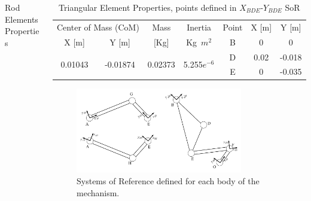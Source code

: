 \documentclass[final]{beamer}
\newlength{\onecolwid}
\newlength{\twocolwid}
\begin{document}
\begin{frame}[t]
\begin{columns}[t]
\begin{column}{\twocolwid}
\begin{columns}[t, totalwidth=\twocolwid]
\begin{column}{\onecolwid}
\begin{table}[h]
	\caption{Rod Elements Properties}
\end{table}
\end{column}

\begin{column}{\onecolwid}

\begin{table}[!h]
\centering
    \label{TAB:TriangleProperties}
\begin{tabular}{ccccccc}
\toprule
\multicolumn{2}{c}{Center of Mass (CoM)}                                  & \multicolumn{1}{c}{Mass}                     & \multicolumn{1}{c}{Inertia}                        & \multicolumn{1}{|c}{Point} & \multicolumn{1}{c}{X {[}m{]}} & \multicolumn{1}{c}{Y {[}m{]}} \\ \cline{5-7} 
X {[}m{]}                & \multicolumn{1}{c}{Y {[}m{]}}                 & \multicolumn{1}{c}{{[}Kg{]}}                 & \multicolumn{1}{c}{Kg~$m^2$}                       & \multicolumn{1}{|c}{B}     & \multicolumn{1}{c}{0}         & \multicolumn{1}{c}{0}         \\ \cline{1-4}
\multirow{2}{*}{0.01043} & \multicolumn{1}{c}{\multirow{2}{*}{-0.01874}} & \multicolumn{1}{c}{\multirow{2}{*}{0.02373}} & \multicolumn{1}{c}{\multirow{2}{*}{5.255$e^{-6}$}} & \multicolumn{1}{|c}{D}     & \multicolumn{1}{c}{0.02}      & \multicolumn{1}{c}{-0.018}    \\
                         & \multicolumn{1}{c}{}                          & \multicolumn{1}{c}{}                         & \multicolumn{1}{c}{}                               & \multicolumn{1}{|c}{E}     & \multicolumn{1}{c}{0}         & \multicolumn{1}{c}{-0.035}    \\
                         
\bottomrule
\end{tabular}
\caption{Triangular Element Properties, points defined in $X_{BDE}$-$Y_{BDE}$ SoR}
\end{table}


\begin{figure}[h]
\centering
\includegraphics[width=0.8\textwidth]{3MBS_Andrew_OABCDEFG.pdf}
\caption{Systems of Reference defined for each body of the mechanism.}
\label{FIG:AndrewMechanismElements}
\end{figure}


\end{column}
\end{columns}
\end{column}
\end{columns}
\end{frame}
\end{document}

